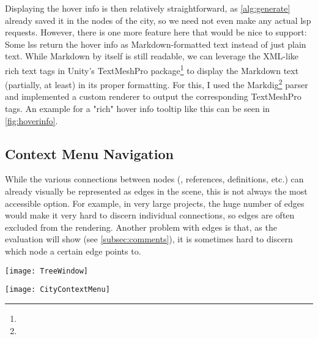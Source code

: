 \documentclass[../thesis]{subfiles}
\begin{document}
Displaying the hover info is then relatively straightforward, as \cref{alg:generate} already saved it in the nodes of the city, so we need not even make any actual \gls{lsp} requests.
However, there is one more feature here that would be nice to support:
Some \glspl{ls} return the hover info as Markdown-formatted text instead of just plain text.
While Markdown by itself is still readable, we can leverage the XML-like rich text tags in Unity's TextMeshPro package\footnote{
} to display the Markdown text (partially, at least) in its proper formatting.
For this, I used the Markdig\footnote{} parser and implemented a custom renderer to output the corresponding TextMeshPro tags.
An example for a "rich" hover info tooltip like this can be seen in \cref{fig:hoverinfo}.

\subsection{Context Menu Navigation}\label{subsec:citycontext}
While the various connections between nodes (\ie{}, references, definitions, etc.) can already visually be represented as edges in the scene, this is not always the most accessible option.
For example, in very large projects, the huge number of edges would make it very hard to discern individual connections, so edges are often excluded from the rendering.
Another problem with edges is that, as the evaluation will show (see \cref{subsec:comments}), it is sometimes hard to discern which node a certain edge points to.

\begin{minipage}[t]{.75\textwidth}
	\centering
	\texttt{[image: TreeWindow]}
	\label{fig:treeview}
\end{minipage}%
\begin{minipage}[t]{.25\textwidth}
	\captionsetup{format=plain}
	\centering
	\texttt{[image: CityContextMenu]}
	\label{fig:contextcity}
\end{minipage}
\end{document}
